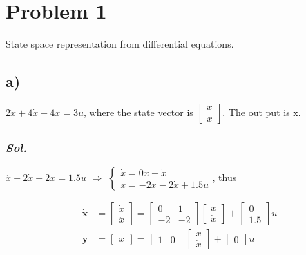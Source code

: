 \section{Problem 1}
    State space representation from differential equations.

    \subsection{a)} 
    $2\ddot{x} + 4\dot{x} + 4x=3u$, where the state vector is 
    $\begin{bmatrix}
        x \\
        \dot{x}
    \end{bmatrix}$.
    The out put is x.
    \subsubsection{\textit{ Sol. }}
    $\ddot{x} + 2\dot{x} + 2x=1.5u$ $\Rightarrow$ 
    $\left\{
        \begin{array}{lr}
        \dot{x} = 0x + \dot{x} \\
        \ddot{x} = -2x -2\dot{x} + 1.5u
        \end{array}
    \right.$, thus

    \begin{align}
        \dot{\textbf{x}} &=
        \begin{bmatrix}
            \dot{x} \\
            \ddot{x}
        \end{bmatrix} = 
        \begin{bmatrix}
            0 & 1 \\
            -2 & -2
        \end{bmatrix}
        \begin{bmatrix}
            x \\
            \dot{x}
        \end{bmatrix} + 
        \begin{bmatrix}
            0\\
            1.5
        \end{bmatrix}
        u
        \\
        \dot{\textbf{y}} &=
        \begin{bmatrix}
            x
        \end{bmatrix} =
        \begin{bmatrix}
            1 & 0
        \end{bmatrix}
        \begin{bmatrix}
            x \\
            \dot{x}
        \end{bmatrix} + 
        \begin{bmatrix}
            0
        \end{bmatrix}
        u
    \end{align}

